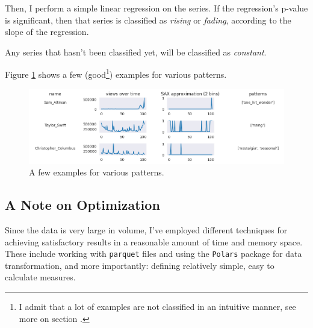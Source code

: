 \documentclass[titlepage]{article}
\begin{document}
Then, I perform a simple linear regression on the series. If the regression's p-value is significant, then that series is classified as \textit{rising} or \textit{fading}, according to the slope of the regression.

Any series that hasn't been classified yet, will be classified as \textit{constant}.

Figure \ref{fig:examples} shows a few (good\footnote{I admit that a lot of examples are not classified in an intuitive manner, see more on section .}) examples for various patterns.



\begin{figure}[H]
    \centering
    \includegraphics[width=\linewidth]{figures/examples.png}
    \caption{A few examples for various patterns.}
    \label{fig:examples}
\end{figure}

\subsection*{A Note on Optimization}
Since the data is very large in volume, I've employed different techniques for achieving satisfactory results in a reasonable amount of time and memory space. These include working with \texttt{parquet} files and using the \texttt{Polars} package \cite{Pola-Rs} for data transformation, and more importantly: defining relatively simple, easy to calculate measures.
\end{document}
